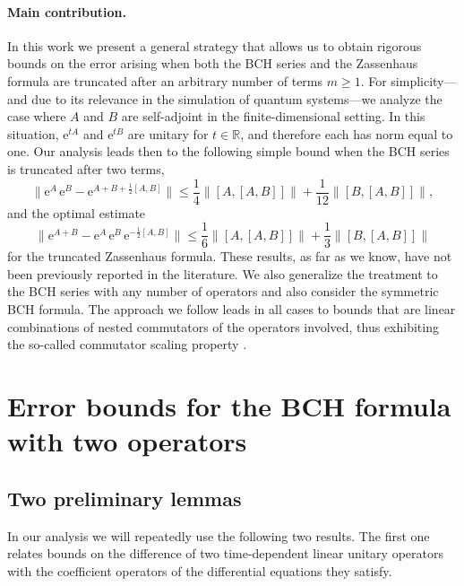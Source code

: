 \documentclass[11pt]{article}
\newcommand{\e}{\ensuremath{\mathrm{e}}}
\begin{document}
\paragraph{Main contribution.} In this work we present a general strategy that allows us to obtain rigorous bounds on the error arising when
both the BCH series and the Zassenhaus formula are truncated after an arbitrary number of terms $m \ge 1$. 
For simplicity---and due to its relevance in the simulation of quantum systems---we analyze the case where $A$ and $B$ are self-adjoint in the finite-dimensional setting. In this situation, $\mathrm{e}^{tA}$ and $\mathrm{e}^{tB}$ are unitary for $t \in \mathbb{R}$, and therefore each has norm equal to one.
Our analysis leads then to the following simple bound when the BCH series is
truncated after two terms,
\begin{equation} \label{nt3}
   \big\|\e^{A} \, \e^{B} -  \e^{A + B + \frac{1}{2}[A, B]} \big\| \le \frac{1}{4} \|[A,[A,B]]\| + \frac{1}{12} \|[B,[A,B]]\|,
\end{equation}
and the optimal estimate
\begin{equation} \label{zass_b2}
   \big\|\e^{A + B} -  \e^{A} \, \e^{B}  \,  \e^{-\frac{1}{2}[A, B]} \big\| \le \frac{1}{6} \|[A,[A,B]]\| + \frac{1}{3} \|[B,[A,B]]\|
\end{equation}
for the truncated Zassenhaus formula.
These results, as far as we know, have not been previously reported in the literature. We also generalize the treatment to the BCH series with any number of operators and also consider the symmetric BCH formula. The approach we follow leads in all cases to bounds that
are linear combinations of nested commutators of the operators involved, thus exhibiting the so-called commutator scaling property \cite{childs21tot}. 

  

\section{Error bounds for the BCH formula with two operators}
\label{sec.2}

\subsection{Two preliminary lemmas}

In our analysis we will repeatedly use the following two results. The first one relates bounds on the difference of two time-dependent linear
unitary operators with the coefficient operators of the differential equations they satisfy.
\end{document}
